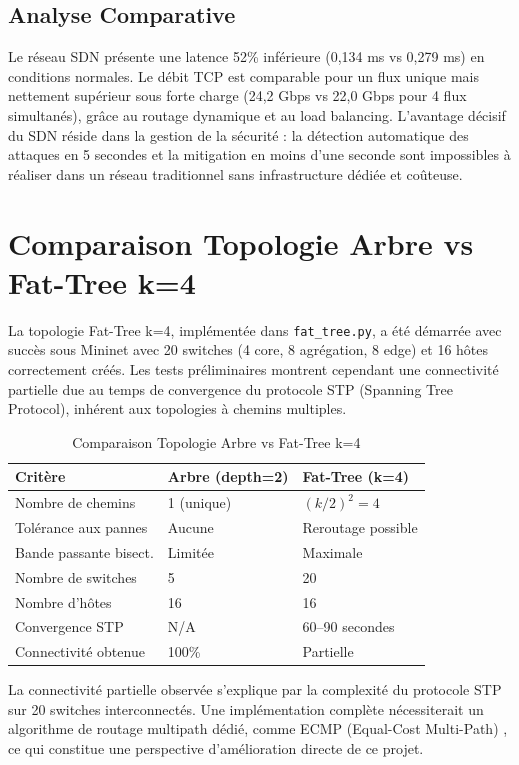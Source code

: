 \documentclass[12pt,a4paper]{report}
\begin{document}
\subsection{Analyse Comparative}
Le réseau SDN présente une latence 52\% inférieure
(0,134 ms vs 0,279 ms) en conditions normales. Le débit
TCP est comparable pour un flux unique mais nettement
supérieur sous forte charge (24,2 Gbps vs 22,0 Gbps
pour 4 flux simultanés), grâce au routage dynamique et
au load balancing. L'avantage décisif du SDN réside dans
la gestion de la sécurité : la détection automatique
des attaques en 5 secondes et la mitigation en moins
d'une seconde sont impossibles à réaliser dans un réseau
traditionnel sans infrastructure dédiée et coûteuse.
\newpage
\section{Comparaison Topologie Arbre vs Fat-Tree k=4}
La topologie Fat-Tree k=4, implémentée dans \texttt{fat\_tree.py},
a été démarrée avec succès sous Mininet avec 20 switches
(4 core, 8 agrégation, 8 edge) et 16 hôtes correctement
créés. Les tests préliminaires montrent cependant une
connectivité partielle due au temps de convergence du
protocole STP (Spanning Tree Protocol), inhérent aux
topologies à chemins multiples.

\begin{table}[H]
\centering
\caption{Comparaison Topologie Arbre vs Fat-Tree k=4}
\label{tab:fattree}
\begin{tabular}{lll}
\toprule
\textbf{Critère} & \textbf{Arbre (depth=2)} &
\textbf{Fat-Tree (k=4)} \\
\midrule
Nombre de chemins & 1 (unique) & $(k/2)^2 = 4$ \\
Tolérance aux pannes & Aucune & Reroutage possible \\
Bande passante bisect. & Limitée & Maximale \\
Nombre de switches & 5 & 20 \\
Nombre d'hôtes & 16 & 16 \\
Convergence STP & N/A & 60--90 secondes \\
Connectivité obtenue & 100\% & Partielle \\
\bottomrule
\end{tabular}
\end{table}

La connectivité partielle observée s'explique par la
complexité du protocole STP sur 20 switches interconnectés.
Une implémentation complète nécessiterait un algorithme
de routage multipath dédié, comme ECMP (Equal-Cost
Multi-Path) \cite{alfares2008scalable}, ce qui constitue
une perspective d'amélioration directe de ce projet.
\end{document}
